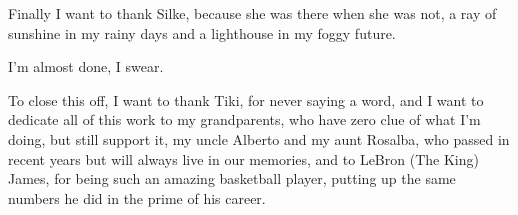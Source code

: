 Finally I want to thank Silke, because she was there when she was not, a ray of sunshine in my rainy
days and a lighthouse in my foggy future.

I'm almost done, I swear.

To close this off, I want to thank Tiki, for never saying a word, and I want to dedicate all of this
work to my grandparents, who have zero clue of what I'm doing, but still support it, my uncle
Alberto and my aunt Rosalba, who passed in recent years but will always live in our memories, and to LeBron
(The King) James, for being such an amazing basketball player, putting up the same numbers he did in
the prime of his career.
